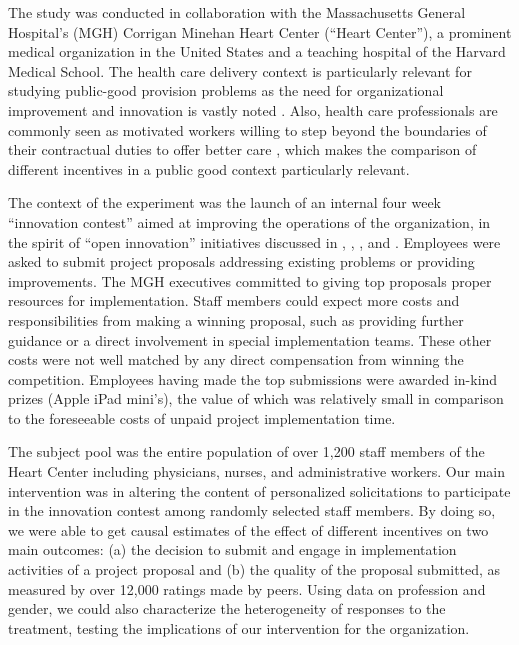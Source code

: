 \documentclass[11pt, titlepage]{article}
\begin{document}
The study was conducted in collaboration with the Massachusetts General
Hospital's (MGH) Corrigan Minehan Heart Center (``Heart Center''), a
prominent medical organization in the United States and a teaching
hospital of the Harvard Medical School. The health care delivery context
is particularly relevant for studying public-good provision problems as
the need for organizational improvement and innovation is vastly noted
\citep[e.g.,][]{cutler2012reducing}. Also, health care professionals are
commonly seen as motivated workers willing to step beyond the boundaries
of their contractual duties to offer better care
\citep{delfgaauw2005dedicated}, which makes the comparison of different
incentives in a public good context particularly relevant.

The context of the experiment was the launch of an internal four week
``innovation contest'' aimed at improving the operations of the
organization, in the spirit of ``open innovation'' initiatives discussed
in \citet{terwiesch2008innovation}, \citet{guinan2013experiments},
\citet{lakhani2013prize}, and \citet{glaeser2016predictive}. Employees
were asked to submit project proposals addressing existing problems or
providing improvements. The MGH executives committed to giving top
proposals proper resources for implementation. Staff members could
expect more costs and responsibilities from making a winning proposal,
such as providing further guidance or a direct involvement in special
implementation teams. These other costs were not well matched by any
direct compensation from winning the competition. Employees having made
the top submissions were awarded in-kind prizes (Apple iPad mini's), the
value of which was relatively small in comparison to the foreseeable
costs of unpaid project implementation time.

The subject pool was the entire population of over 1,200 staff members
of the Heart Center including physicians, nurses, and administrative
workers. Our main intervention was in altering the content of
personalized solicitations to participate in the innovation contest
among randomly selected staff members. By doing so, we were able to get
causal estimates of the effect of different incentives on two main
outcomes: (a) the decision to submit and engage in implementation
activities of a project proposal and (b) the quality of the proposal
submitted, as measured by over 12,000 ratings made by peers. Using data
on profession and gender, we could also characterize the heterogeneity
of responses to the treatment, testing the implications of our
intervention for the organization.
\end{document}

